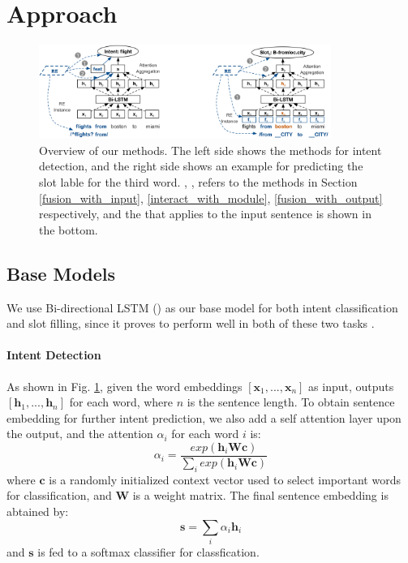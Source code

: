 \section{Approach}

\begin{figure}[t!]
\begin{center}
\includegraphics[width=0.85\textwidth]{figure/re_nn_overview.png}    
\caption{Overview of our methods. The left side shows the methods for intent detection, and the right side shows an example for predicting the slot lable for the third word. , ,  refers to the methods in Section \ref{fusion_with_input}, \ref{interact_with_module}, \ref{fusion_with_output} respectively, and the \RE that applies to the input sentence is shown in the bottom.}
\label{fig_overview}
\end{center}
\vspace{-1em}
\end{figure}

\subsection{Base Models}
We use Bi-directional LSTM (\BLSTM) as our base \NN model for both intent classification and slot filling, since it proves to perform well in both of these two tasks \cite{liu2016attention}. 
\paragraph{Intent Detection}
As shown in Fig. \ref{fig_overview}, given the word embeddings $[\textbf{x}_1, ..., \textbf{x}_n]$ as input, \BLSTM outputs $[\textbf{h}_1, ..., \textbf{h}_n]$ for each word, where $n$ is the sentence length. To obtain sentence embedding for further intent prediction, we also add a self attention layer upon the \BLSTM output, and the attention $\alpha_i$ for each word $i$ is:
\begin{equation}
\alpha_i=\frac{exp(\textbf{h}_i\textbf{Wc})}{\sum_{i}{exp(\textbf{h}_i\textbf{Wc})}}
\end{equation}
where $\textbf{c}$ is a randomly initialized context vector used to select important words for classification, and $\textbf{W}$ is a weight matrix. The final sentence embedding is abtained by: 
\begin{equation}
\textbf{s} = \sum_{i}{\alpha_i\textbf{h}_i}
\end{equation}
and $\textbf{s}$ is fed to a softmax classifier for classfication.

